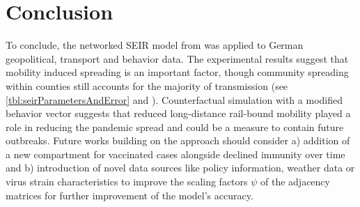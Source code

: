 \section{Conclusion}
To conclude, the networked SEIR model from \cite{vrabacCapturingEffectsTransportation2020} was applied to German geopolitical, transport and behavior data. The experimental results suggest that mobility induced spreading is an important factor, though community spreading within counties still accounts for the majority of transmission (see \autoref{tbl:seirParametersAndError} and \cite{aravindakshanPreparingFutureCOVID192020}). Counterfactual simulation with a modified behavior vector suggests that reduced long-distance rail-bound mobility played a role in reducing the pandemic spread and could be a measure to contain future outbreaks. Future works building on the approach should consider a) addition of a new compartment for vaccinated cases alongside declined immunity over time \cite{bjornstadSEIRSModelInfectious2020} and b) introduction of novel data sources like policy information, weather data or virus strain characteristics to improve the scaling factors $\psi$ of the adjacency matrices for further improvement of the model's accuracy.
